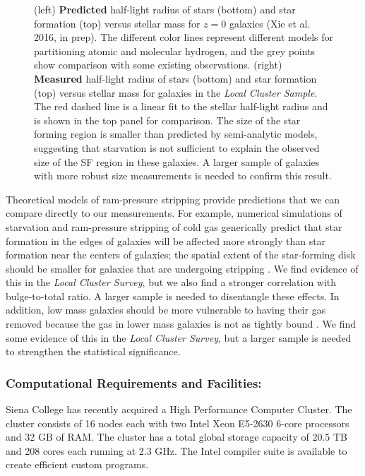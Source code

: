\documentclass[12pt, preprint]{aastex}
\begin{document}
{\begin{figure}[h!]
\caption{ (left) {\bf Predicted} half-light radius
  of stars (bottom) and star formation (top) versus stellar mass for
  $z = 0 $ galaxies (Xie et al. 2016, in prep).
  The different color lines represent different models for partitioning
  atomic and molecular hydrogen, and the grey points show comparison
  with some existing observations.  
(right) {\bf Measured} half-light radius of stars (bottom) and star
formation (top) versus stellar mass for galaxies in the {\it Local Cluster Sample}.  The
red dashed line is a linear fit to the stellar half-light radius and
is shown in the top panel for comparison.  The size of the star
forming region is smaller than predicted by semi-analytic models,
suggesting that starvation is not sufficient to explain the observed
size of the SF region in these galaxies.  A larger sample of galaxies
with more robust size measurements is needed to confirm this result.}
\label{lizhi_comparison}
\end{figure}



Theoretical models of ram-pressure stripping provide predictions that
we can compare directly to our measurements.
For example, numerical simulations of starvation and ram-pressure stripping of cold gas 
generically predict that star formation in the edges
of galaxies will be affected more strongly than star formation near the
centers of galaxies; the spatial extent of the star-forming disk
should be smaller for galaxies that are undergoing stripping \citep[e.g.][]{kawata08, bekki14}.
We find evidence of this in the {\it Local Cluster Survey}, but we
also find a stronger correlation with bulge-to-total ratio.  A larger
sample is needed to disentangle these effects.
In addition, low mass galaxies should be more
vulnerable to having their gas removed 
because the gas in lower mass galaxies is not as tightly
bound \citep[e.g.][]{kawata08, mccarthy07, bekki14}.  We find
some evidence of this in the {\it Local Cluster Survey}, but a larger
sample is needed to strengthen the statistical significance. 

\subsubsection{Computational Requirements and
  Facilities:   \label{comp}}
\vspace*{-.4cm}
Siena College has recently acquired a High Performance  Computer
Cluster. The cluster %
consists of 16 nodes each with two
Intel Xeon E5-2630 6-core processors and 32 GB of RAM.  The cluster
has a total global storage capacity of 20.5 TB and 208 cores each
running at 2.3 GHz.  
The Intel
compiler suite is available to create efficient custom programs.


}
\end{document}
